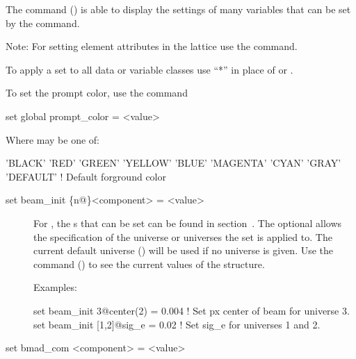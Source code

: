 {{\vskip 0.2in 

The  command () is able to display the settings
of many variables that can be set by the  command.

Note: For setting element attributes in the 
lattice use the  command.

To apply a set to all data or variable classes use ``*''
in place of  or .

To set the prompt color, use the command
\begin{example}
  set global prompt_color = <value>
\end{example}
Where  may be one of:
\begin{example}
  'BLACK'
  'RED'
  'GREEN'
  'YELLOW'
  'BLUE'
  'MAGENTA'
  'CYAN'
  'GRAY'
  'DEFAULT'       ! Default forground color
\end{example}



\begin{description}

\item[set beam\_init \{n@\}<component> = <value>] \Newline

\vskip -0.2in

For , the s that can be set can be
found in section~. The optional  allows the
specification of the universe or universes the set is applied to. The
current default universe () will be used if no
universe is given. Use the  command () to
see the current values of the  structure.

Examples:
\begin{example}
  set beam_init 3@center(2) = 0.004  ! Set px center of beam for universe 3.
  set beam_init [1,2]@sig_e = 0.02   ! Set sig_e for universes 1 and 2.
\end{example}


\item[set bmad_com <component> = <value>] \Newline

\vskip -0.2in


\end{description}}}
